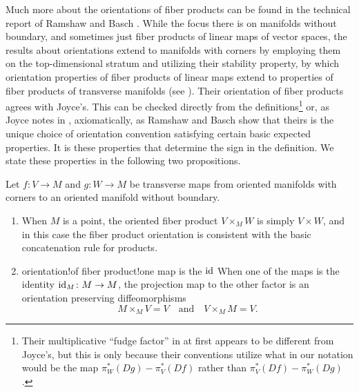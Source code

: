 Much more about the orientations of fiber products can be found in the technical report of Ramshaw and Basch \cite{RamBas09}.
While the focus there is on manifolds without boundary, and sometimes just fiber products of linear maps of vector spaces, the results about orientations extend to manifolds with corners by employing them on the top-dimensional stratum and utilizing their stability property, by which orientation properties of fiber products of linear maps extend to properties of fiber products of transverse manifolds (see \cite[Sections 6.3, 9.1.2, and 9.3]{RamBas09}).
Their orientation of fiber products agrees with Joyce's.
This can be checked directly from the definitions\footnote{Their multiplicative ``fudge factor'' in \cite[Theorem 9.14]{RamBas09} at first appears to be different from Joyce's, but this is only because their conventions utilize what in our notation would be the map $\pi_W^*(Dg)-\pi_V^*(Df)$ rather than $\pi_V^*(Df)-\pi_W^*(Dg)$.} or, as Joyce notes in \cite[Remark 7.6.iii]{Joy12}, axiomatically, as Ramshaw and Basch show that theirs is the unique choice of orientation convention satisfying certain basic expected properties.
It is these properties that determine the sign in the definition.
We state these properties in the following two propositions.

\begin{proposition}\label{P: oriented fiber product basic properties}
	Let $f \colon V \to M$ and $g \colon W \to M$ be transverse maps from oriented manifolds with corners to an oriented manifold without boundary.
	\begin{enumerate}
		\item{} When $M$ is a point, the oriented fiber product $V \times_M W$ is simply $V \times W$, and in this case the fiber product orientation is consistent with the basic concatenation rule for products.
		\item{orientation!of fiber product!one map is the $\mathrm{id}$} When one of the maps is the identity $\mathrm{id}_M \colon M \to M$, the projection map to the other factor is an orientation preserving diffeomorphisms
		\begin{equation*}
			M \times_M V = V\quad\text{and}\quad V \times_M M = V.
		\end{equation*}
	\end{enumerate}
\end{proposition}

